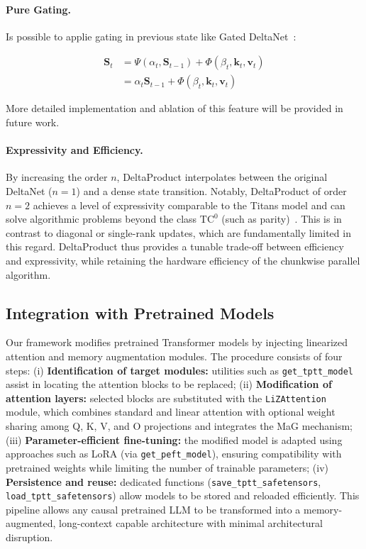 \documentclass[10pt,a4paper]{article}
\begin{document}
\paragraph{Pure Gating.}

Is possible to applie gating in previous state like Gated DeltaNet~\cite{siems2025deltaproduct}:

\begin{align}
    \mathbf{S}_t &= \Psi(\alpha_t, \mathbf{S}_{t-1}) + \Phi(\beta_t, \mathbf{k}_t,\mathbf{v}_t)  \\
    &= \alpha_t \mathbf{S}_{t-1} + \Phi(\beta_t, \mathbf{k}_t,\mathbf{v}_t)
    \label{eq:gateddelta}
\end{align}

More detailed implementation and ablation of this feature will be provided in future work.

\paragraph{Expressivity and Efficiency.}

By increasing the order $n$, DeltaProduct interpolates between the original DeltaNet ($n=1$) and a dense state transition. Notably, DeltaProduct of order $n=2$ achieves a level of expressivity comparable to the Titans model and can solve algorithmic problems beyond the class $\mathrm{TC}^0$ (such as parity)~\cite{siems2025deltaproduct, merrill2024illusion}. This is in contrast to diagonal or single-rank updates, which are fundamentally limited in this regard. DeltaProduct thus provides a tunable trade-off between efficiency and expressivity, while retaining the hardware efficiency of the chunkwise parallel algorithm.


\subsection{Integration with Pretrained Models}

Our framework modifies pretrained Transformer models by injecting linearized attention and memory augmentation modules. The procedure consists of four steps: (i) \textbf{Identification of target modules:} utilities such as \texttt{get\_tptt\_model} assist in locating the attention blocks to be replaced; (ii) \textbf{Modification of attention layers:} selected blocks are substituted with the \texttt{LiZAttention} module, which combines standard and linear attention with optional weight sharing among Q, K, V, and O projections and integrates the MaG mechanism; (iii) \textbf{Parameter-efficient fine-tuning:} the modified model is adapted using approaches such as LoRA (via \texttt{get\_peft\_model}), ensuring compatibility with pretrained weights while limiting the number of trainable parameters; (iv) \textbf{Persistence and reuse:} dedicated functions (\texttt{save\_tptt\_safetensors}, \texttt{load\_tptt\_safetensors}) allow models to be stored and reloaded efficiently. This pipeline allows any causal pretrained LLM to be transformed into a memory-augmented, long-context capable architecture with minimal architectural disruption.
\end{document}
